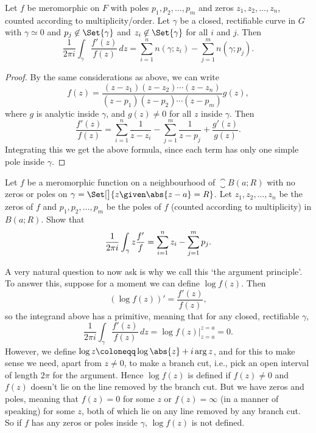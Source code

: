 \begin{theorem}\label{thm5.7}
	Let $f$ be meromorphic on $F$ with poles $p_1, p_2, \dots, p_m$ and zeros $z_1, z_2, \dots, z_n$, counted according to multiplicity/order.
	Let $\gamma$ be a closed, rectifiable curve in $G$ with $\gamma \simeq 0$ and $p_j \not\in \Set{\gamma}$ and $z_i \not\in \Set{\gamma}$ for all $i$ and $j$.
	Then
	\[
		\frac{1}{2 \pi i} \int_\gamma \frac{f'(z)}{f(z)} \, d z = \sum_{i = 1}^n n(\gamma; z_i) - \sum_{j = 1}^m n(\gamma; p_j).
	\]
\end{theorem}

\begin{proof}
	By the same considerations as above, we can write
	\[
		f(z) = \frac{(z - z_1) (z - z_2) \dotsm (z - z_n)}{(z - p_1) (z - p_2) \dotsm (z - p_m)} g(z),
	\]
	where $g$ is analytic inside $\gamma$, and $g(z) \neq 0$ for all $z$ inside $\gamma$.
	Then
	\[
		\frac{f'(z)}{f(z)} = \sum_{i = 1}^n \frac{1}{z - z_i} - \sum_{j = 1}^m \frac{1}{z - p_j} + \frac{g'(z)}{g(z)}.
	\]
	Integrating this we get the above formula, since each term has only one simple pole inside $\gamma$.
\end{proof}

\begin{exercise}
	Let $f$ be a meromorphic function on a neighbourhood of $\closure{B(a; R)}$ with no zeros or poles on $\gamma = \Set[\big]{z \given \abs{z - a} = R}$.
	Let $z_1, z_2, \dots, z_n$ be the zeros of $f$ and $p_1, p_2, \dots, p_m$ be the poles of $f$ (counted according to multiplicity) in $B(a; R)$.
	Show that
	\[
		\frac{1}{2 \pi i} \int_\gamma z \frac{f'}{f} = \sum_{i = 1}^n z_i - \sum_{j = 1}^m p_j. \qedhere
	\]
\end{exercise}

A very natural question to now ask is why we call this `the argument principle'.
To answer this, suppose for a moment we can define $\log f(z)$.
Then
\[
	(\log f(z))' = \frac{f'(z)}{f(z)},
\]
so the integrand above has a primitive, meaning that for any closed, rectifiable $\gamma$,
\[
	\frac{1}{2 \pi i} \int_\gamma \frac{f'(z)}{f(z)} \, d z = \log f(z) \biggr\rvert_{z = a}^{z = a} = 0.
\]
However, we define $\log z \coloneqq \log\abs{z} + i \arg z$, and for this to make sense we need, apart from $z \neq 0$, to make a branch cut, i.e., pick an open interval of length $2 \pi$ for the argument.
Hence $\log f(z)$ is defined if $f(z) \neq 0$ and $f(z)$ doesn't lie on the line removed by the branch cut.
But we have zeros and poles, meaning that $f(z) = 0$ for some $z$ or $f(z) = \infty$ (in a manner of speaking) for some $z$, both of which lie on any line removed by any branch cut.
So if $f$ has any zeros or poles inside $\gamma$, $\log f(z)$ is not defined.

